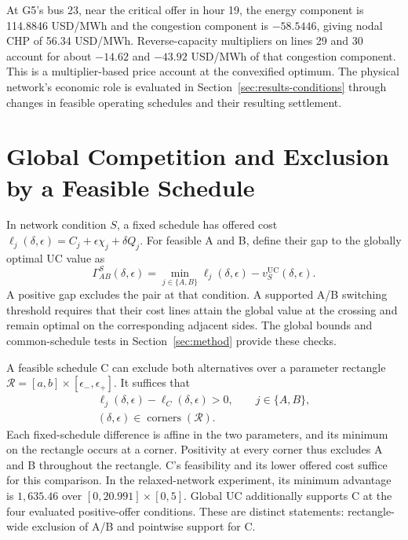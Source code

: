 \documentclass[journal]{IEEEtran}
\newcommand{\UC}{\mathrm{UC}}
\begin{document}
At G5's bus 23, near the critical offer in hour 19, the energy component is 114.8846 USD/MWh and the congestion component is $-58.5446$, giving nodal CHP of 56.34 USD/MWh. Reverse-capacity multipliers on lines 29 and 30 account for about $-14.62$ and $-43.92$ USD/MWh of that congestion component. This is a multiplier-based price account at the convexified optimum. The physical network's economic role is evaluated in Section~\ref{sec:results-conditions} through changes in feasible operating schedules and their resulting settlement.

\section{Global Competition and Exclusion by a Feasible Schedule}\label{app:competition}
In network condition $S$, a fixed schedule has offered cost $\ell_j(\delta,\epsilon)=C_j+\epsilon\chi_j+\delta Q_j$. For feasible A and B, define their gap to the globally optimal UC value as
\begin{equation}
 \Gamma_{AB}^{S}(\delta,\epsilon)=\min_{j\in\{A,B\}}\ell_j(\delta,\epsilon)-v_S^{\UC}(\delta,\epsilon).\label{eq:competition-gap}
\end{equation}
A positive gap excludes the pair at that condition. A supported A/B switching threshold requires that their cost lines attain the global value at the crossing and remain optimal on the corresponding adjacent sides. The global bounds and common-schedule tests in Section~\ref{sec:method} provide these checks.

A feasible schedule C can exclude both alternatives over a parameter rectangle $\mathcal R=[a,b]\times[\epsilon_-,\epsilon_+]$. It suffices that
\begin{equation}
 \begin{gathered}
 \ell_j(\delta,\epsilon)-\ell_C(\delta,\epsilon)>0,\qquad j\in\{A,B\},\\
 (\delta,\epsilon)\in\operatorname{corners}(\mathcal R).
 \end{gathered}\label{eq:competitor-exclusion}
\end{equation}
Each fixed-schedule difference is affine in the two parameters, and its minimum on the rectangle occurs at a corner. Positivity at every corner thus excludes A and B throughout the rectangle. C's feasibility and its lower offered cost suffice for this comparison. In the relaxed-network experiment, its minimum advantage is $1{,}635.46$ over $[0,20.991]\times[0,5]$. Global UC additionally supports C at the four evaluated positive-offer conditions. These are distinct statements: rectangle-wide exclusion of A/B and pointwise support for C.
\end{document}

